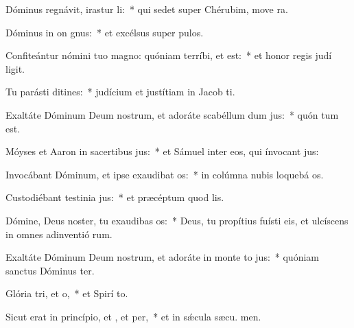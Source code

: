 \item Dóminus regnávit, irastur li:~* qui sedet super Chérubim, move ra.
\item Dóminus in on gnus:~* et excélsus super  pulos.
\item Confiteántur nómini tuo magno: quóniam terríbi, et  est:~* et honor regis judí ligit.
\item Tu parásti ditines:~* judícium et justítiam in Jacob  ti.
\item Exaltáte Dóminum Deum nostrum, et adoráte scabéllum dum jus:~* quón tum est.
\item Móyses et Aaron in sacertibus jus:~* et Sámuel inter eos, qui ínvocant  jus:
\item Invocábant Dóminum, et ipse exaudibat os:~* in colúmna nubis loquebá  os.
\item Custodiébant testinia jus:~* et præcéptum quod  lis.
\item Dómine, Deus noster, tu exaudibas os:~* Deus, tu propítius fuísti eis, et ulcíscens in omnes adinventió rum.
\item Exaltáte Dóminum Deum nostrum, et adoráte in monte to jus:~* quóniam sanctus Dóminus  ter.
\item Glória tri, et o,~* et Spirí to.
\item Sicut erat in princípio, et , et per,~* et in sǽcula sæcu. men.
